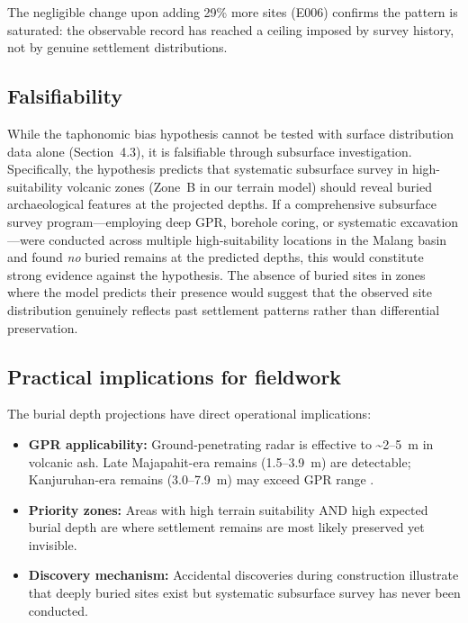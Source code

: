 \documentclass[12pt,letterpaper]{article}
\begin{document}
The negligible change upon adding 29\% more sites (E006) confirms the pattern is saturated: the observable record has reached a ceiling imposed by survey history, not by genuine settlement distributions.

\subsection{Falsifiability}

While the taphonomic bias hypothesis cannot be tested with surface distribution data alone (Section~4.3), it is falsifiable through subsurface investigation. Specifically, the hypothesis predicts that systematic subsurface survey in high-suitability volcanic zones (Zone~B in our terrain model) should reveal buried archaeological features at the projected depths. If a comprehensive subsurface survey program---employing deep GPR, borehole coring, or systematic excavation---were conducted across multiple high-suitability locations in the Malang basin and found \textit{no} buried remains at the predicted depths, this would constitute strong evidence against the hypothesis. The absence of buried sites in zones where the model predicts their presence would suggest that the observed site distribution genuinely reflects past settlement patterns rather than differential preservation.

\subsection{Practical implications for fieldwork}

The burial depth projections have direct operational implications:

\begin{itemize}
  \item \textbf{GPR applicability:} Ground-penetrating radar is effective to \textasciitilde2--5~m in volcanic ash. Late Majapahit-era remains (1.5--3.9~m) are detectable; Kanjuruhan-era remains (3.0--7.9~m) may exceed GPR range \citep{conyers2004}.
  \item \textbf{Priority zones:} Areas with high terrain suitability AND high expected burial depth are where settlement remains are most likely preserved yet invisible.
  \item \textbf{Discovery mechanism:} Accidental discoveries during construction illustrate that deeply buried sites exist but systematic subsurface survey has never been conducted.
\end{itemize}
\end{document}
